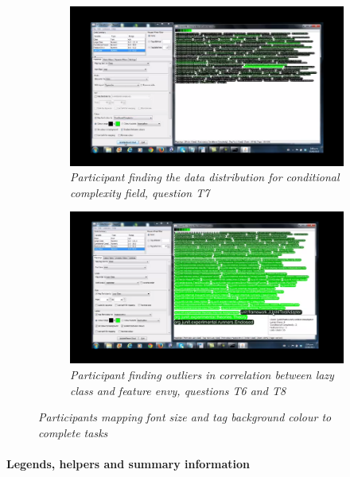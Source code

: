 \begin{figure}[!htb]
	\centering
\begin{subfigure}{\textwidth}
	\centering
  \includegraphics[scale=0.50]{distribution.png}
  \caption{\textit{Participant finding the data distribution for conditional complexity field, question T7}}
\end{subfigure}
\begin{subfigure}{\textwidth}
	\centering
 \includegraphics[scale=0.50]{outliers.png}
  \caption{\textit{Participant finding outliers in correlation between lazy class and feature envy, questions T6 and T8}}
\end{subfigure}
  \caption{\textit{Participants mapping font size and tag background colour to complete tasks}}
\label{fig:mapping}
\end{figure}


\paragraph{Legends, helpers and summary information}

